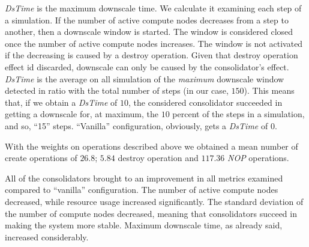 \textit{DsTime} is the maximum downscale time. We calculate it examining each step of a simulation. If the number of active compute nodes decreases from a step to another, then a downscale window is started. The window is considered closed once the number of active compute nodes increases. The window is not activated if the decreasing is caused by a destroy operation. Given that destroy operation effect id discarded, downscale can only be caused by the consolidator's effect. \textit{DsTime} is the average on all simulation of the \emph{maximum} downscale window detected in ratio with the total number of steps (in our case, $150$). This means that, if we obtain a \textit{DsTime} of $10$, the considered consolidator succeeded in getting a downscale for, at maximum, the $10$ percent of the steps in a simulation, and so, ``15'' steps. ``Vanilla'' configuration, obviously, gets a \textit{DsTime} of $0$.

With the weights on operations described above we obtained a mean number of create operations of $26.8$; $5.84$ destroy operation and $117.36$ \textit{NOP} operations.

All of the consolidators brought to an improvement in all metrics examined compared to ``vanilla'' configuration. The number of active compute nodes decreased, while resource usage increased significantly. The standard deviation of the number of compute nodes decreased, meaning that consolidators succeed in making the system more stable. Maximum downscale time, as already said, increased considerably.

